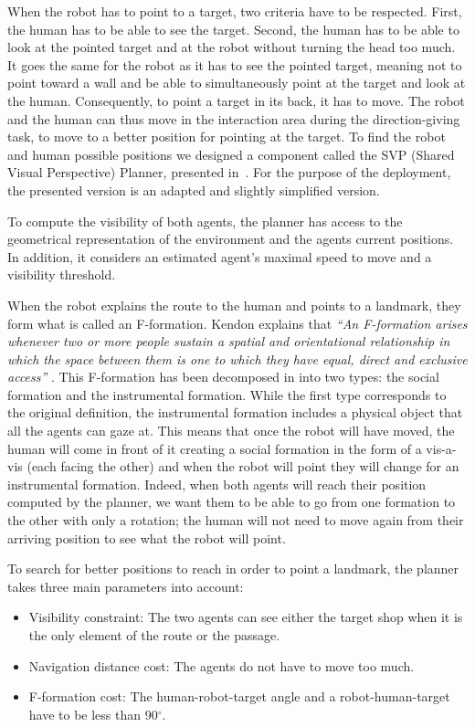 \documentclass[a4paper,11pt,twoside]{StyleThese}
\begin{document}
When the robot has to point to a target, two criteria have to be respected. First, the human has to be able to see the target. Second, the human has to be able to look at the pointed target and at the robot without turning the head too much. It goes the same for the robot as it has to see the pointed target, meaning not to point toward a wall and be able to simultaneously point at the target and look at the human. Consequently, to point a target in its back, it has to move. The robot and the human can thus move in the interaction area during the direction-giving task, to move to a better position for pointing at the target. To find the robot and human possible positions we designed a component called the SVP (Shared Visual Perspective) Planner, presented in~\cite{waldhart_2019_reasoning}. For the purpose of the deployment, the presented version is an adapted and slightly simplified version.

To compute the visibility of both agents, the planner has access to the geometrical representation of the environment and the agents current positions. In addition, it considers an estimated agent's maximal speed to move and a visibility threshold.

When the robot explains the route to the human and points to a landmark, they form what is called an F-formation. Kendon explains that \textit{``An F-formation arises whenever two or more people sustain a spatial and orientational relationship in which the space between them is one to which they have equal, direct and exclusive access''} \cite{kendon_1990_conducting}.
This F-formation has been decomposed in \cite{mcneill_2005_gesture} into two types: the social formation and the instrumental formation. While the first type corresponds to the original definition, the instrumental formation includes a physical object that all the agents can gaze at. This means that once the robot will have moved, the human will come in front of it creating a social formation in the form of a vis-a-vis (each facing the other) and when the robot will point they will change for an instrumental formation. Indeed, when both agents will reach their position computed by the planner, we want them to be able to go from one formation to the other with only a rotation; the human will not need to move again from their arriving position to see what the robot will point. 

To search for better positions to reach in order to point a landmark, the planner takes three main parameters into account:

\begin{itemize}
	\item Visibility constraint: The two agents can see either the target shop when it is the only element of the route or the passage.
	\item Navigation distance cost: The agents do not have to move too much.
	\item F-formation cost: The human-robot-target angle and a robot-human-target have to be less than 90${^\circ}$. 
\end{itemize}
\end{document}
